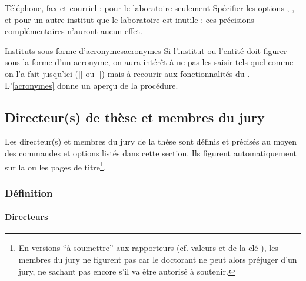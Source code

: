 %
\begin{dbremark}{Téléphone, fax et courriel : pour le
    laboratoire seulement}{}
  Spécifier les options , ,  et
   pour un autre institut que le laboratoire est inutile :
  ces précisions complémentaires n'auront aucun effet.
\end{dbremark}
%
\begin{dbremark}{Instituts sous forme d'acronymes}{acronymes}
  Si l'institut ou l'entité doit figurer sous la forme d'un acronyme, on aura
  intérêt à ne pas les saisir tels quel comme on l'a fait jusqu'ici
  (|| ou ||) mais à recourir aux
  fonctionnalités du . L'\vref{acronymes} donne un aperçu
  de la procédure.
\end{dbremark}

\subsection{Directeur(s) de thèse et membres du jury}\label{sec-jury}

Les directeur(s) et membres du jury de la thèse sont définis et précisés au
moyen des commandes et options listés dans cette section. Ils figurent
automatiquement sur la ou les pages de titre\footnote{En versions \enquote{à
    soumettre} aux rapporteurs (cf. valeurs \protect{} et
  \protect{} de la clé \protect{}), les
  membres du jury ne figurent pas car le doctorant ne peut alors préjuger d'un
  jury, ne sachant pas encore s'il va être autorisé à soutenir.}.

\subsubsection{Définition}\label{sec-definition-directeurs-jury}

\paragraph{Directeurs}\label{sec-definition-directeurs}
%

